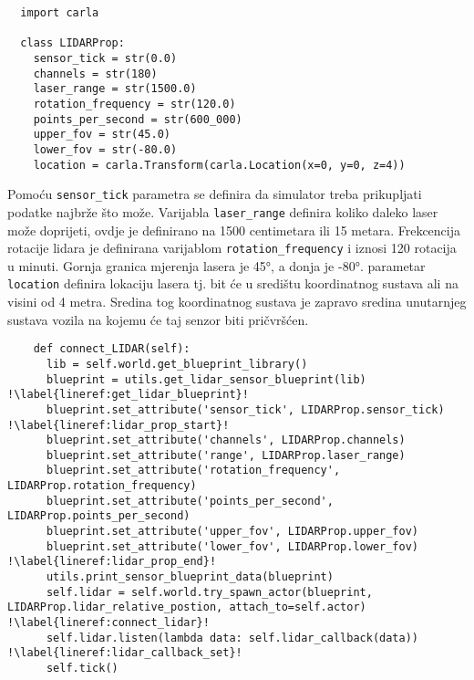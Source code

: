 \begin{listing}[h!]
  \begin{verbatim}
  import carla

  class LIDARProp:
    sensor_tick = str(0.0)
    channels = str(180)
    laser_range = str(1500.0)
    rotation_frequency = str(120.0)
    points_per_second = str(600_000)
    upper_fov = str(45.0)
    lower_fov = str(-80.0)
    location = carla.Transform(carla.Location(x=0, y=0, z=4))
  \end{verbatim}
  \caption{LIDAR atributi}
  \label{coderef:lidar_props}
\end{listing}

Pomoću \texttt{sensor_tick} parametra se definira da simulator treba  prikupljati podatke najbrže što može. Varijabla \texttt{laser_range} definira koliko daleko laser može doprijeti, ovdje je definirano na 1500 centimetara ili 15 metara. Frekcencija rotacije lidara je definirana varijablom \texttt{rotation_frequency} i iznosi 120 rotacija u minuti. Gornja granica mjerenja lasera je 45°, a donja je -80°. parametar \texttt{location} definira lokaciju lasera tj. bit će u središtu koordinatnog sustava ali na visini od 4 metra. Sredina tog koordinatnog sustava je zapravo sredina unutarnjeg sustava vozila na kojemu će taj senzor biti pričvršćen.

\pagebreak
\begin{listing}[h!]
  \begin{verbatim}
    def connect_LIDAR(self):
      lib = self.world.get_blueprint_library()
      blueprint = utils.get_lidar_sensor_blueprint(lib) !\label{lineref:get_lidar_blueprint}!
      blueprint.set_attribute('sensor_tick', LIDARProp.sensor_tick) !\label{lineref:lidar_prop_start}!
      blueprint.set_attribute('channels', LIDARProp.channels)
      blueprint.set_attribute('range', LIDARProp.laser_range)
      blueprint.set_attribute('rotation_frequency', LIDARProp.rotation_frequency)
      blueprint.set_attribute('points_per_second', LIDARProp.points_per_second)
      blueprint.set_attribute('upper_fov', LIDARProp.upper_fov)
      blueprint.set_attribute('lower_fov', LIDARProp.lower_fov) !\label{lineref:lidar_prop_end}!
      utils.print_sensor_blueprint_data(blueprint)
      self.lidar = self.world.try_spawn_actor(blueprint, LIDARProp.lidar_relative_postion, attach_to=self.actor)  !\label{lineref:connect_lidar}!
      self.lidar.listen(lambda data: self.lidar_callback(data))  !\label{lineref:lidar_callback_set}!
      self.tick()
  \end{verbatim}
  \caption{Stvaranje LIDAR senzora}
  \label{coderef:lidar_find_spawn}
\end{listing}

